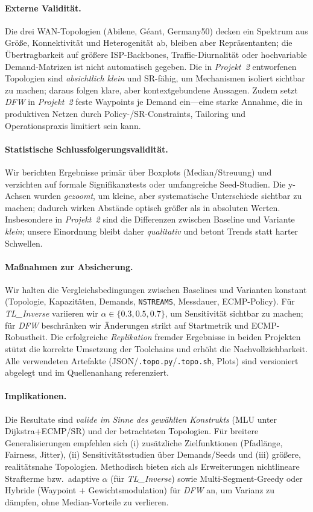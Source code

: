\documentclass[sigconf,nonacm,review]{acmart}
\begin{document}
\paragraph{Externe Validität.}
Die drei WAN-Topologien (Abilene, Géant, Germany50) decken ein Spektrum aus Größe, Konnektivität und Heterogenität ab, bleiben aber Repräsentanten; die Übertragbarkeit auf größere ISP-Backbones, Traffic-Diurnalität oder hochvariable Demand-Matrizen ist nicht automatisch gegeben. Die in \textit{Projekt~2} entworfenen Topologien sind \emph{absichtlich klein} und SR-fähig, um Mechanismen isoliert sichtbar zu machen; daraus folgen klare, aber kontextgebundene Aussagen. Zudem setzt \emph{DFW} in \textit{Projekt~2} feste Waypoints je Demand ein—eine starke Annahme, die in produktiven Netzen durch Policy-/SR-Constraints, Tailoring und Operationspraxis limitiert sein kann.

\paragraph{Statistische Schlussfolgerungsvalidität.}
Wir berichten Ergebnisse primär über Boxplots (Median/Streuung) und verzichten auf formale Signifikanztests oder umfangreiche Seed-Studien. Die y-Achsen wurden \emph{gezoomt}, um kleine, aber systematische Unterschiede sichtbar zu machen; dadurch wirken Abstände optisch größer als in absoluten Werten. Insbesondere in \textit{Projekt~2} sind die Differenzen zwischen Baseline und Variante \emph{klein}; unsere Einordnung bleibt daher \emph{qualitativ} und betont Trends statt harter Schwellen.

\paragraph{Maßnahmen zur Absicherung.}
Wir halten die Vergleichsbedingungen zwischen Baselines und Varianten konstant (Topologie, Kapazitäten, Demands, \texttt{NSTREAMS}, Messdauer, ECMP-Policy). Für \emph{TL\_Inverse} variieren wir $\alpha\in\{0.3,0.5,0.7\}$, um Sensitivität sichtbar zu machen; für \emph{DFW} beschränken wir Änderungen strikt auf Startmetrik und ECMP-Robustheit. Die erfolgreiche \emph{Replikation} fremder Ergebnisse in beiden Projekten stützt die korrekte Umsetzung der Toolchains und erhöht die Nachvollziehbarkeit. Alle verwendeten Artefakte (JSON/\texttt{.topo.py}/\texttt{.topo.sh}, Plots) sind versioniert abgelegt und im Quellenanhang referenziert.

\paragraph{Implikationen.}
Die Resultate sind \emph{valide im Sinne des gewählten Konstrukts} (MLU unter Dijkstra+ECMP/SR) und der betrachteten Topologien. Für breitere Generalisierungen empfehlen sich (i) zusätzliche Zielfunktionen (Pfadlänge, Fairness, Jitter), (ii) Sensitivitätsstudien über Demands/Seeds und (iii) größere, realitätsnahe Topologien. Methodisch bieten sich als Erweiterungen nichtlineare Strafterme bzw.\ adaptive $\alpha$ (für \emph{TL\_Inverse}) sowie Multi-Segment-Greedy oder Hybride (Waypoint $+$ Gewichtsmodulation) für \emph{DFW} an, um Varianz zu dämpfen, ohne Median-Vorteile zu verlieren.
\end{document}
